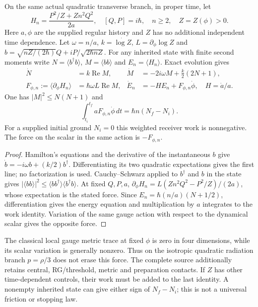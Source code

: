 \documentclass[12pt,a4paper]{article}
\begin{document}
\begin{theorem}
\label{p7:thm:v2217-gauge-force-work}
On the same actual quadratic transverse branch, in proper time, let
\[
 H_n=\frac{P^2/Z+Zn^2Q^2}{2a},\quad [Q,P]=i\hbar,
 \quad n\ge2,\quad Z=Z(\phi)>0.
\]
Here $a,\phi$ are the supplied regular history and $Z$ has no additional
independent time dependence. Let $\omega=n/a$, $k=\dot{\log Z}$,
$L=\partial_\phi\log Z$ and
$b=\sqrt{nZ/(2\hbar)}Q+iP/\sqrt{2\hbar nZ}$.
For any inherited state with finite second moments write
$N=\langle b^\dagger b\rangle$, $M=\langle bb\rangle$ and
$E_n=\langle H_n\rangle$. Exact evolution gives
\begin{align*}
 \dot N&=k\operatorname{Re}M,&
 \dot M&=-2i\omega M+\tfrac{k}{2}(2N+1),\\
 F_{\phi,n}:=\langle\partial_\phi H_n\rangle
   &=\hbar\omega L\operatorname{Re}M,&
 \dot E_n&=-H E_n+F_{\phi,n}\dot\phi,\quad H=\dot a/a.
\end{align*}
One has $|M|^2\le N(N+1)$ and
\[
 \int_{t_i}^{t_f}aF_{\phi,n}\dot\phi\,dt
       =\hbar n(N_f-N_i).
\]
For a supplied initial ground $N_i=0$ this weighted receiver work is
nonnegative. The force on the scalar in the same action is $-F_{\phi,n}$.
\end{theorem}
\begin{proof}
Hamilton's equations and the derivative of the instantaneous $b$ give
$\dot b=-i\omega b+(k/2)b^\dagger$. Differentiating its two quadratic
expectations gives the first line; no factorization is used.
Cauchy--Schwarz applied to $b^\dagger$ and $b$ in the state gives
$|\langle bb\rangle|^2\le\langle bb^\dagger\rangle
\langle b^\dagger b\rangle$. At fixed $Q,P,a$,
$\partial_\phi H_n=L(Zn^2Q^2-P^2/Z)/(2a)$, whose expectation is the
stated force. Since $E_n=\hbar(n/a)(N+1/2)$, differentiation gives the
energy equation and multiplication by $a$ integrates to the work identity.
Variation of the same gauge action with respect to the dynamical scalar
gives the opposite force.
\end{proof}
The classical local gauge metric trace at fixed $\phi$ is zero in four
dimensions, while its scalar variation is generally nonzero. Thus on the
isotropic quadratic radiation branch $p=\rho/3$ does not erase this force.
The complete source additionally retains central, RG/threshold, metric and
preparation contacts. If $Z$ has other time-dependent controls, their work
must be added to the last identity. A nonempty inherited state can give
either sign of $N_f-N_i$; this is not a universal friction or stopping law.
\end{document}
